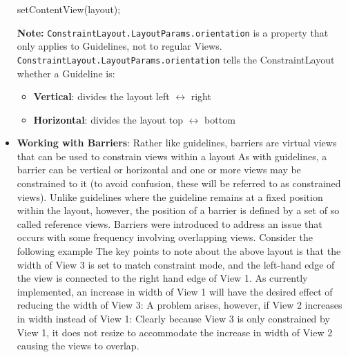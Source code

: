 \documentclass{report}
\begin{document}
\begin{itemize}
\begin{javacode}
                setContentView(layout);
            \end{javacode}
            \bigbreak \noindent 
            \textbf{Note:} \texttt{ConstraintLayout.LayoutParams.orientation} is a property that only applies to Guidelines, not to regular Views.
            \bigbreak \noindent 
            \texttt{ConstraintLayout.LayoutParams.orientation} tells the ConstraintLayout whether a Guideline is:
            \begin{itemize}
                \item \textbf{Vertical}: divides the layout left $\leftrightarrow $ right
                \item \textbf{Horizontal}: divides the layout top $\leftrightarrow$ bottom
            \end{itemize}
        \item \textbf{Working with Barriers}: Rather like guidelines, barriers are virtual views that can be used to constrain views within a layout
            \bigbreak \noindent 
            As with guidelines, a barrier can be vertical or horizontal and one or more views may be constrained to it (to avoid confusion, these will be referred to as constrained views).
            \bigbreak \noindent 
            Unlike guidelines where the guideline remains at a fixed position within the layout, however, the position of a barrier is defined by a set of so called reference views.
            \bigbreak \noindent 
            Barriers were introduced to address an issue that occurs with some frequency involving overlapping views.
            \bigbreak \noindent 
            Consider the following example
            \bigbreak \noindent 
            \bigbreak \noindent 
            The key points to note about the above layout is that the width of View 3 is set to match constraint mode, and the left-hand edge of the view is connected to the right hand edge of View 1.
            \bigbreak \noindent 
            As currently implemented, an increase in width of View 1 will have the desired effect of reducing the width of View 3:
            \bigbreak \noindent 
            \bigbreak \noindent 
            A problem arises, however, if View 2 increases in width instead of View 1:
            \bigbreak \noindent 
            \bigbreak \noindent 
            Clearly because View 3 is only constrained by View 1, it does not resize to accommodate the increase in width of View 2 causing the views to overlap.

\end{itemize}
\end{document}
